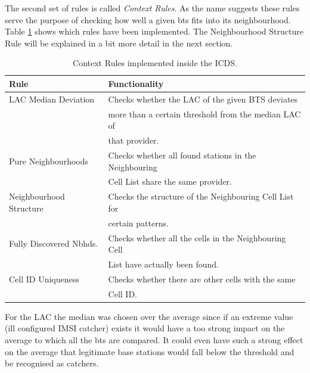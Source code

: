 The second set of rules is called \emph{Context Rules}.
As the name suggests these rules serve the purpose of checking how well a given \gls{bts} fits into its neighbourhood.
Table \ref{tab:context_rules} shows which rules have been implemented.
The Neighbourhood Structure Rule will be explained in a bit more detail in the next section.
\begin{table}
\centering
\begin{tabular}{ll}
\toprule
Rule					&Functionality\\
\midrule
LAC Median Deviation	&Checks whether the LAC of the given BTS deviates\\
						&more than a certain threshold from the median LAC of\\
						&that provider.\\
Pure Neighbourhoods		&Checks whether all found stations in the Neighbouring\\
						&Cell List share the same provider.\\
Neighbourhood Structure	&Checks the structure of the Neighbouring Cell List for\\
						&certain patterns.\\
Fully Discovered Nbhds. &Checks whether all the cells in the Neighbouring Cell\\
						&List have actually been found.\\
Cell ID Uniqueness 		&Checks whether there are other cells with the same\\
						&Cell ID.\\
\bottomrule
\end{tabular}
\caption{Context Rules implemented inside the ICDS.}
\label{tab:context_rules}
\end{table}
For the LAC the median was chosen over the average since if an extreme value (ill configured IMSI catcher) exists it would have a too strong impact on the average to which all the \gls{bts} are compared.
It could even have such a strong effect on the average that legitimate base stations would fall below the threshold and be recognised as catchers.

